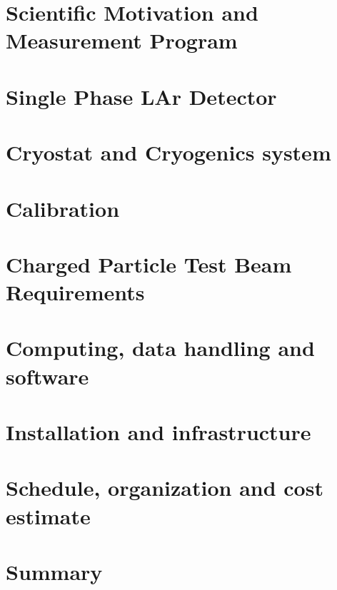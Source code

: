 \documentclass[12pt]{article}
\begin{document}
\section{Scientific Motivation and Measurement Program} %
	
	

\section{Single Phase LAr Detector} 

	


\section{Cryostat and Cryogenics system} %
	
	
\section{Calibration}
	

\section{Charged Particle Test Beam Requirements} %
	


\section{Computing, data handling and software} %
	

\section{Installation and infrastructure}  %
	
	
	
\section{Schedule, organization and cost estimate} %
	

\section{Summary}  %
	



\end{document}
